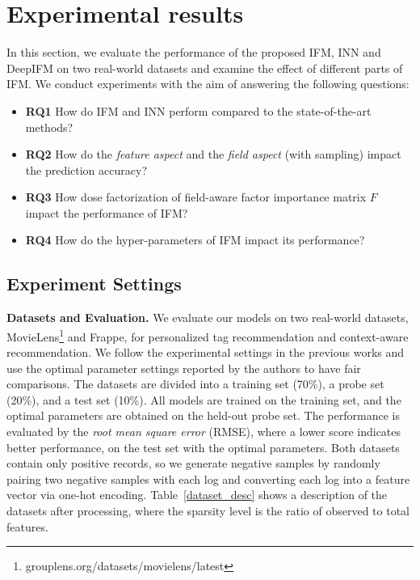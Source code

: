 \documentclass[letterpaper]{article} \usepackage{aaai19}  \usepackage{times}  \usepackage{helvet}  \usepackage{courier}  \usepackage{url}  \usepackage{graphicx}  \frenchspacing  \setlength{\pdfpagewidth}{8.5in}  \setlength{\pdfpageheight}{11in}  \usepackage{mathtools}
\begin{document}
 
\section{Experimental results}
In this section, we evaluate the performance of the proposed IFM, INN and DeepIFM on two real-world datasets and examine the effect of different parts of IFM. We conduct experiments with the aim of answering the following questions:
\begin{itemize}
\item \textbf{RQ1} How do IFM and INN perform compared to the state-of-the-art methods?
\item \textbf{RQ2} How do the \emph{feature aspect} and the \emph{field aspect} (with sampling) impact the prediction accuracy?
\item \textbf{RQ3} How dose factorization of field-aware factor importance matrix $F$ impact the performance of IFM?
\item \textbf{RQ4} How do the hyper-parameters of IFM impact its performance?

\end{itemize} 
\subsection{Experiment Settings}

\textbf{Datasets and Evaluation.} We evaluate our models on two real-world datasets, MovieLens\footnote{grouplens.org/datasets/movielens/latest}\cite{harper2015movielens} and Frappe\cite{baltrunas2015frappe}, for personalized tag recommendation and context-aware recommendation.
We follow the experimental settings in the previous works\cite{xiaoattentional,he2017neural} and use the optimal parameter settings reported by the authors to have fair comparisons. 
The datasets are divided into a training set (70\%), a probe set (20\%), and a test set (10\%). All models are trained on the training set, and the optimal parameters are obtained on the held-out probe set. The performance is evaluated by the \emph{root mean square error} (RMSE), where a lower score indicates better performance, on the test set with the optimal parameters. Both datasets contain only positive records, so we generate negative samples by randomly pairing two negative samples with each log and converting each log into a feature vector via one-hot encoding. Table~\ref{dataset_desc} shows a description of the datasets after processing, where the sparsity level is the ratio of observed to total features\cite{lee2012comparative}.
\end{document}

